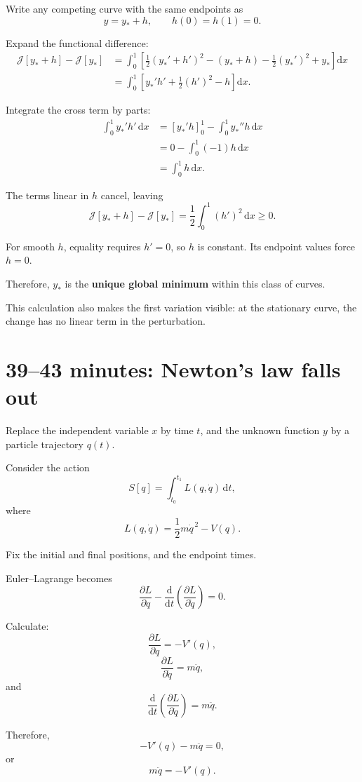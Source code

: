 \documentclass[11pt,a4paper]{article}
\newcommand{\dd}{\mathrm{d}}
\newcommand{\J}{\mathcal{J}}
\begin{document}
Write any competing curve with the same endpoints as
\[
y=y_*+h,
\qquad
h(0)=h(1)=0.
\]

Expand the functional difference:
\begin{align*}
\J[y_*+h]-\J[y_*]
&=
\int_0^1
\left[
\frac12(y_*'+h')^2-(y_*+h)
-\frac12(y_*')^2+y_*
\right]\dd x\\
&=
\int_0^1
\left[
y_*'h'+\frac12(h')^2-h
\right]\dd x.
\end{align*}

Integrate the cross term by parts:
\begin{align*}
\int_0^1 y_*'h'\,\dd x
&=
[y_*'h]_0^1-\int_0^1 y_*''h\,\dd x\\
&=
0-\int_0^1(-1)h\,\dd x\\
&=
\int_0^1h\,\dd x.
\end{align*}

The terms linear in \(h\) cancel, leaving
\[
\boxed{
\J[y_*+h]-\J[y_*]
=
\frac12\int_0^1(h')^2\,\dd x
\geq0.
}
\]

For smooth \(h\), equality requires \(h'=0\), so \(h\) is constant.
Its endpoint values force \(h=0\).

Therefore, \(y_*\) is the \textbf{unique global minimum}
within this class of curves.

This calculation also makes the first variation visible:
at the stationary curve, the change has no linear term in the
perturbation.

\section*{39--43 minutes: Newton's law falls out}

Replace the independent variable \(x\) by time \(t\), and the unknown
function \(y\) by a particle trajectory \(q(t)\).

Consider the action
\[
S[q]
=
\int_{t_0}^{t_1}
L(q,\dot q)\,\dd t,
\]
where
\[
L(q,\dot q)=\frac12m\dot q^{\,2}-V(q).
\]

Fix the initial and final positions, and the endpoint times.

Euler--Lagrange becomes
\[
\frac{\partial L}{\partial q}
-
\frac{\dd}{\dd t}
\left(
\frac{\partial L}{\partial\dot q}
\right)
=0.
\]

Calculate:
\[
\frac{\partial L}{\partial q}=-V'(q),
\]
\[
\frac{\partial L}{\partial\dot q}=m\dot q,
\]
and
\[
\frac{\dd}{\dd t}
\left(
\frac{\partial L}{\partial\dot q}
\right)
=m\ddot q.
\]

Therefore,
\[
-V'(q)-m\ddot q=0,
\]
or
\[
\boxed{
m\ddot q=-V'(q).
}
\]
\end{document}
